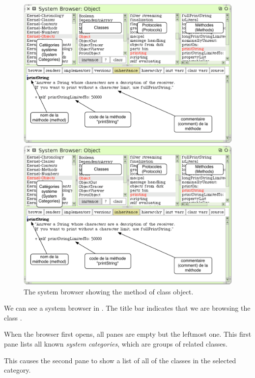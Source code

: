 \documentclass[a4paper,10pt,twoside]{book}
\begin{document}
\begin{figure}[htb]
\ifluluelse
	{\centerline {\includegraphics[width=\textwidth]{ClassBrowser1}}}
	{\centerline {\includegraphics[scale=0.7]{ClassBrowser1}}}
\caption{The system browser showing the  method of class object.
\label{fig:classBrowser}}
\end{figure}

We can see a system browser in .
The title bar indicates that we are browsing the class .

When the browser first opens, all panes are empty but the leftmost one.
This first pane lists all known \emph{system categories}, which are groups of related classes.

This causes the second pane to show a list of all of the classes in the selected category.
\end{document}
